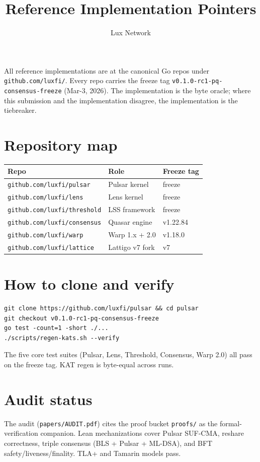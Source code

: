 \documentclass[11pt]{article}
\title{Reference Implementation Pointers}
\author{Lux Network}
\date{}
\begin{document}
\maketitle

All reference implementations are at the canonical Go repos under
\verb|github.com/luxfi/|. Every repo carries the freeze tag
\verb|v0.1.0-rc1-pq-consensus-freeze| (Mar-3, 2026). The implementation is
the byte oracle; where this submission and the implementation disagree, the
implementation is the tiebreaker.

\section{Repository map}

\begin{longtable}{p{}p{}p{}}
\toprule
\textbf{Repo} & \textbf{Role} & \textbf{Freeze tag} \\
\midrule
\verb|github.com/luxfi/pulsar| & Pulsar kernel & freeze \\
\verb|github.com/luxfi/lens| & Lens kernel & freeze \\
\verb|github.com/luxfi/threshold| & LSS framework & freeze \\
\verb|github.com/luxfi/consensus| & Quasar engine & v1.22.84 \\
\verb|github.com/luxfi/warp| & Warp 1.x + 2.0 & v1.18.0 \\
\verb|github.com/luxfi/lattice| & Lattigo v7 fork & v7 \\
\bottomrule
\end{longtable}

\section{How to clone and verify}

\begin{verbatim}
git clone https://github.com/luxfi/pulsar && cd pulsar
git checkout v0.1.0-rc1-pq-consensus-freeze
go test -count=1 -short ./...
./scripts/regen-kats.sh --verify
\end{verbatim}

The five core test suites (Pulsar, Lens, Threshold, Consensus, Warp 2.0) all
pass on the freeze tag. KAT regen is byte-equal across runs.

\section{Audit status}

The audit (\verb|papers/AUDIT.pdf|) cites the proof bucket \verb|proofs/| as
the formal-verification companion. Lean mechanizations cover Pulsar SUF-CMA,
reshare correctness, triple consensus (BLS + Pulsar + ML-DSA), and BFT
safety/liveness/finality. TLA+ and Tamarin models pass.
\end{document}
